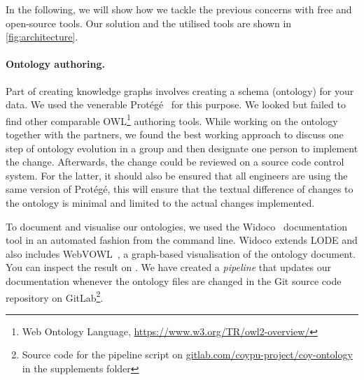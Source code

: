 \documentclass[
hf
]{ceurart}
\begin{document}
In the following, we will show how we tackle the previous concerns with free and open-source tools. Our solution and the utilised tools are shown in \autoref{fig:architecture}.

\paragraph{Ontology authoring.}\label{para:onto}
Part of creating knowledge graphs involves creating a schema (ontology) for your data. We used the venerable Protégé~\cite{musen2015protege} for this purpose. We looked but failed to find other comparable OWL\footnote{Web Ontology Language, \url{https://www.w3.org/TR/owl2-overview/}} authoring tools. While working on the ontology together with the partners, we found the best working approach to discuss one step of ontology evolution in a group and then designate one person to implement the change. Afterwards, the change could be reviewed on a source code control system. For the latter, it should also be ensured that all engineers are using the same version of Protégé, this will ensure that the textual difference of changes to the ontology is minimal and limited to the actual changes implemented.


To document and visualise our ontologies, we used the Widoco~\cite{garijo2017widoco} documentation tool in an automated fashion from the command line.  Widoco extends LODE and also includes WebVOWL~\cite{lohmann2015webvowl}, a graph-based visualisation of the ontology document. You can inspect the result on . We have created a \emph{pipeline} that updates our documentation whenever the ontology files are changed in the Git source code repository on GitLab\footnote{Source code for the pipeline script on \href{https://gitlab.com/coypu-project/coy-ontology/}{gitlab.com/coypu-project/coy-ontology} in the supplements folder}.

\end{document}
